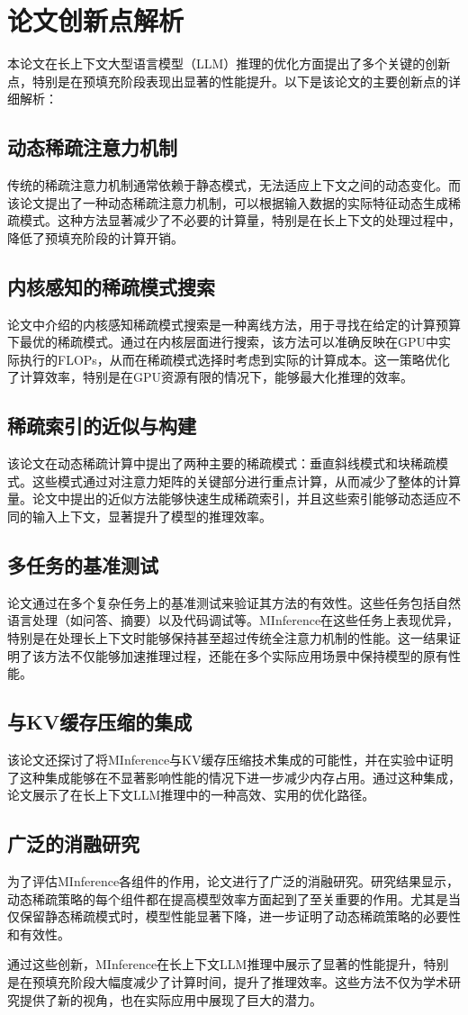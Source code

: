 \documentclass[twocolumn, 10pt]{article} %
\theoremstyle{remark}
\begin{document}
\section{论文创新点解析}

本论文在长上下文大型语言模型（LLM）推理的优化方面提出了多个关键的创新点，特别是在预填充阶段表现出显著的性能提升。以下是该论文的主要创新点的详细解析：

\subsection{动态稀疏注意力机制}
传统的稀疏注意力机制通常依赖于静态模式，无法适应上下文之间的动态变化。而该论文提出了一种动态稀疏注意力机制，可以根据输入数据的实际特征动态生成稀疏模式。这种方法显著减少了不必要的计算量，特别是在长上下文的处理过程中，降低了预填充阶段的计算开销。

\subsection{内核感知的稀疏模式搜索}
论文中介绍的内核感知稀疏模式搜索是一种离线方法，用于寻找在给定的计算预算下最优的稀疏模式。通过在内核层面进行搜索，该方法可以准确反映在GPU中实际执行的FLOPs，从而在稀疏模式选择时考虑到实际的计算成本。这一策略优化了计算效率，特别是在GPU资源有限的情况下，能够最大化推理的效率。

\subsection{稀疏索引的近似与构建}
该论文在动态稀疏计算中提出了两种主要的稀疏模式：垂直斜线模式和块稀疏模式。这些模式通过对注意力矩阵的关键部分进行重点计算，从而减少了整体的计算量。论文中提出的近似方法能够快速生成稀疏索引，并且这些索引能够动态适应不同的输入上下文，显著提升了模型的推理效率。

\subsection{多任务的基准测试}
论文通过在多个复杂任务上的基准测试来验证其方法的有效性。这些任务包括自然语言处理（如问答、摘要）以及代码调试等。MInference在这些任务上表现优异，特别是在处理长上下文时能够保持甚至超过传统全注意力机制的性能。这一结果证明了该方法不仅能够加速推理过程，还能在多个实际应用场景中保持模型的原有性能。

\subsection{与KV缓存压缩的集成}
该论文还探讨了将MInference与KV缓存压缩技术集成的可能性，并在实验中证明了这种集成能够在不显著影响性能的情况下进一步减少内存占用。通过这种集成，论文展示了在长上下文LLM推理中的一种高效、实用的优化路径。

\subsection{广泛的消融研究}
为了评估MInference各组件的作用，论文进行了广泛的消融研究。研究结果显示，动态稀疏策略的每个组件都在提高模型效率方面起到了至关重要的作用。尤其是当仅保留静态稀疏模式时，模型性能显著下降，进一步证明了动态稀疏策略的必要性和有效性。

通过这些创新，MInference在长上下文LLM推理中展示了显著的性能提升，特别是在预填充阶段大幅度减少了计算时间，提升了推理效率。这些方法不仅为学术研究提供了新的视角，也在实际应用中展现了巨大的潜力。
\end{document}
